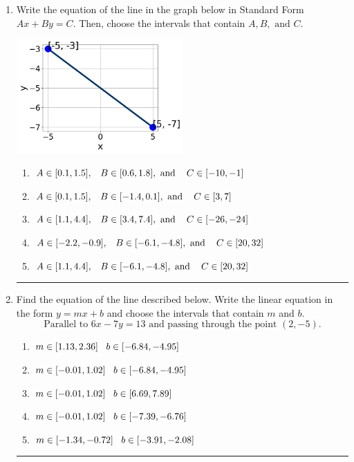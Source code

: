 \documentclass[14pt]{extbook}
\newcommand{\litem}[1]{\item#1\hspace*{-1cm}\rule{\textwidth}{0.4pt}}
\begin{document}
\begin{enumerate}
{\begin{enumerate}[label=\Alph*.]
\end{enumerate} }
\litem{
Write the equation of the line in the graph below in Standard Form $Ax+By=C$. Then, choose the intervals that contain $A, B, \text{ and } C$.
\begin{center}
    \includegraphics[width=0.5\textwidth]{../Figures/linearGraphToStandardB.png}
\end{center}
\begin{enumerate}[label=\Alph*.]
\item \( A \in [0.1, 1.5], \hspace{3mm} B \in [0.6, 1.8], \text{ and } \hspace{3mm} C \in [-10, -1] \)
\item \( A \in [0.1, 1.5], \hspace{3mm} B \in [-1.4, 0.1], \text{ and } \hspace{3mm} C \in [3, 7] \)
\item \( A \in [1.1, 4.4], \hspace{3mm} B \in [3.4, 7.4], \text{ and } \hspace{3mm} C \in [-26, -24] \)
\item \( A \in [-2.2, -0.9], \hspace{3mm} B \in [-6.1, -4.8], \text{ and } \hspace{3mm} C \in [20, 32] \)
\item \( A \in [1.1, 4.4], \hspace{3mm} B \in [-6.1, -4.8], \text{ and } \hspace{3mm} C \in [20, 32] \)

\end{enumerate} }
\litem{
Find the equation of the line described below. Write the linear equation in the form $ y=mx+b $ and choose the intervals that contain $m$ and $b$.\[ \text{Parallel to } 6 x - 7 y = 13 \text{ and passing through the point } (2, -5). \]\begin{enumerate}[label=\Alph*.]
\item \( m \in [1.13, 2.36] \hspace*{3mm} b \in [-6.84, -4.95] \)
\item \( m \in [-0.01, 1.02] \hspace*{3mm} b \in [-6.84, -4.95] \)
\item \( m \in [-0.01, 1.02] \hspace*{3mm} b \in [6.69, 7.89] \)
\item \( m \in [-0.01, 1.02] \hspace*{3mm} b \in [-7.39, -6.76] \)
\item \( m \in [-1.34, -0.72] \hspace*{3mm} b \in [-3.91, -2.08] \)


\end{enumerate}}
\end{enumerate}
\end{document}
